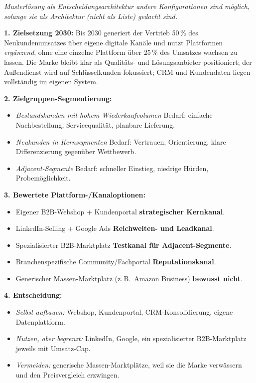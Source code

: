 \documentclass[11pt,a4paper,oneside]{article}
\begin{document}
\begin{loesungbox}
\emph{Musterlösung als Entscheidungsarchitektur \textendash{} andere Konfigurationen sind möglich, solange sie als Architektur (nicht als Liste) gedacht sind.}

\smallskip
\textbf{1. Zielsetzung 2030:} Bis 2030 generiert der Vertrieb 50\,\% des Neukundenumsatzes über eigene digitale Kanäle und nutzt Plattformen \emph{ergänzend}, ohne eine einzelne Plattform über 25\,\% des Umsatzes wachsen zu lassen. Die Marke bleibt klar als Qualitäts- und Lösungsanbieter positioniert; der Außendienst wird auf Schlüsselkunden fokussiert; CRM und Kundendaten liegen vollständig im eigenen System.

\smallskip
\textbf{2. Zielgruppen-Segmentierung:}
\begin{itemize}
  \item \emph{Bestandskunden mit hohem Wiederkaufvolumen} \textendash{} Bedarf: einfache Nachbestellung, Servicequalität, planbare Lieferung.
  \item \emph{Neukunden in Kernsegmenten} \textendash{} Bedarf: Vertrauen, Orientierung, klare Differenzierung gegenüber Wettbewerb.
  \item \emph{Adjacent-Segmente} \textendash{} Bedarf: schneller Einstieg, niedrige Hürden, Probemöglichkeit.
\end{itemize}

\textbf{3. Bewertete Plattform-/Kanaloptionen:}
\begin{itemize}
  \item Eigener B2B-Webshop + Kundenportal \textrightarrow{} \textbf{strategischer Kernkanal}.
  \item LinkedIn-Selling + Google Ads \textrightarrow{} \textbf{Reichweiten- und Leadkanal}.
  \item Spezialisierter B2B-Marktplatz \textrightarrow{} \textbf{Testkanal für Adjacent-Segmente}.
  \item Branchenspezifische Community/Fachportal \textrightarrow{} \textbf{Reputationskanal}.
  \item Generischer Massen-Marktplatz (z.\,B.\ Amazon Business) \textrightarrow{} \textbf{bewusst nicht}.
\end{itemize}

\textbf{4. Entscheidung:}
\begin{itemize}
  \item \emph{Selbst aufbauen:} Webshop, Kundenportal, CRM-Konsolidierung, eigene Datenplattform.
  \item \emph{Nutzen, aber begrenzt:} LinkedIn, Google, ein spezialisierter B2B-Marktplatz \textendash{} jeweils mit Umsatz-Cap.
  \item \emph{Vermeiden:} generische Massen-Marktplätze, weil sie die Marke verwässern und den Preisvergleich erzwingen.
\end{itemize}


\end{loesungbox}
\end{document}
